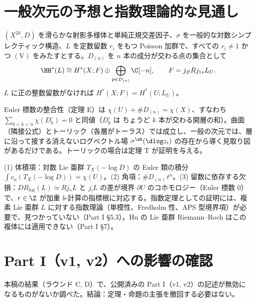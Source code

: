\section{一般次元の予想と指数理論的な見通し}\label{sec:conj}
\begin{conj}[一般の単純正規交差の対数シンプレクティック多様体]\tK\label{conj:gen}
$(X^{2k},D)$ を滑らかな射影多様体と単純正規交差因子、$\sigma$ を一般的な対数シンプレクティック構造、$L$ を定数留数 $r_i$ をもつ Poisson 加群で、すべての $r_i\ne1$ かつ $\mathrm{(V)}$ をみたすとする。$D_{(n)}$ を $n$ 本の成分が交わる点の集合として
\[\HH^*(L)\cong H^*(X;F)\oplus\bigoplus_{p\in D_{(n)}}\C[-n],\qquad F=j_{2!}Rj_{1*}L_U.\]
$L$ に正の整数留数がなければ $H^*(X;F)=H^*(U;L_U)$。
\end{conj}
Euler 標数の整合性（定理 E）は $\chi(U)+\#D_{(n)}=\chi(X)$、すなわち $\sum_{0<k<n}\chi(D_k^\circ)=0$ と同値（$D_k^\circ$ は ちょうど $k$ 本が交わる開層の和）。曲面（隣接公式）とトーリック（各層がトーラス）では成立し\tP、一般の次元では、層に沿って接する消えないログベクトル場 $\sigma^\sh(\dlog z_i)$ の存在から導く見取り図があるだけである\tK。トーリックの場合は定理 T が証明を与える。

\begin{obs}[指数理論的な見通し\ \tK]
(1) 体積項：対数 Lie 亜群 $T_X(-\log D)$ の Euler 類の積分 $\int c_n(T_X(-\log D))=\chi(U)$。(2) 角項：$\#D_{(n)}\,t^n$。(3) 留数に依存する欠損：$DR_{\log}(L)\simeq Rj_*L$ と $j_!L$ の差が境界 $\partial U$ のコホモロジー（Euler 標数 0）で、$r\in\Z$ が加重 $b$-計算の指標根に対応する。指数定理としての証明には、複素 Lie 亜群 $L$ に対する指数理論（単模性、Fredholm 性、APS 型境界項）が必要で、見つかっていない（Part I \S5.3）。Hu の Lie 亜群 Riemann--Roch はこの複体には適用できない（Part I \S7）。
\end{obs}

\section{Part I（v1, v2）への影響の確認}\label{sec:chk}
本稿の結果（ラウンド C, D）で、公開済みの Part I（v1, v2）の記述が無効になるものがないか調べた。結論：定理・命題の主張を撤回する必要はない。

